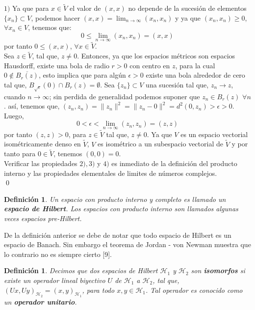 \documentclass[12pt]{book}
\numberwithin{equation}{chapter}
\newtheorem{definition}[theorem]{Definici\'on}
\def\n{\noindent}
\def\rar{\rightarrow}
\def\H{\mathcal{H}}
\begin{document}
\n$1)$ Ya que para $x \in \tilde{V}$ el valor de $(x,x)$ no depende de la sucesi\'on de elementos $\{x_{n}\} \subset V$, podemos hacer $(x,x)= \lim_{n \rar \infty} (x_{n},x_{n}) $ y ya que $ (x_{n},x_{n}) \geq 0 $, $\forall x_{n} \in V$, tenemos que: 
$$ 0 \leq \lim_{n \rar \infty} (x_{n},x_{n})= ( x,x ) $$
por tanto $0 \leq (x,x)$, $ \forall x \in \tilde{V} $.\\
Sea $z \in \tilde{V}$, tal que, $z \neq 0$. Entonces, ya que los espacios m\'etricos son espacios Hausdorff, existe una bola de radio $r >0$ con centro en $z$, para la cual  $ 0 \notin \overline{B_{r}(z)}$, esto implica que para alg\'un $\epsilon >0$ existe una bola alrededor de cero tal que, $ B_{\sqrt{\epsilon}}(0) \cap B_{r}(z)= \emptyset $. Sea $\{ z_{n} \} \subset V$ una sucesi\'on tal que, $z_{n} \rar z $, cuando $ n \rar \infty $; sin perdida de generalidad podemos suponer que $ z_{n} \in B_{r}(z) $ $\forall n$. as\'i, tenemos que, $ (z_{n},z_{n})= \|z_{n}\|^{2}= \|z_{n}-0\|^{2}=d^{2}(0,z_{n}) >\epsilon > 0$. Luego,
$$ 0 < \epsilon < \lim_{n \rar \infty} (z_{n},z_{n})= (z,z) $$
por tanto $ (z,z)>0 $, para $z \in \tilde{V}$ tal que, $z\neq 0$. Ya que $V$ es un espacio vectorial isom\'etricamente denso en $\tilde{V}$, $V$ es isom\'etrico a un subespacio vectorial de $\tilde{V}$ y por tanto para $0 \in \tilde{V}$, tenemos $(0,0)=0$. \\ 
Verificar las propiedades $2),3)$ y $4)$ es inmediato de la definici\'on del producto interno y las propiedades elementales de limites de n\'umeros complejos. \\ \qed

\vspace{5 mm}

\begin{definition}
Un espacio con producto interno y completo es llamado un {\bf espacio de Hilbert}. Los espacios con producto interno son llamados algunas veces espacios pre-Hilbert.
\end{definition}

\vspace{5 mm}

De la definici\'on anterior se debe de notar que todo espacio de Hilbert es un espacio de Banach. Sin embargo el teorema de Jordan - von Newman muestra que lo contrario no es siempre cierto [9].

\vspace{5 mm}

\begin{definition}\label{unita}
Decimos que dos espacios de Hilbert $\H_{1}$ y $\H_{2}$ son {\bf isomorfos} si existe un operador lineal biyectivo $U$ de $\H_{1}$ a $\H_{2}$, tal que, $ (Ux,Uy)_{\H_{2}}=(x,y)_{\H_{1}} $, para todo $x,y \in \H_{1}$. Tal operador es conocido como un {\bf operador unitario}.
\end{definition}
\end{document}
